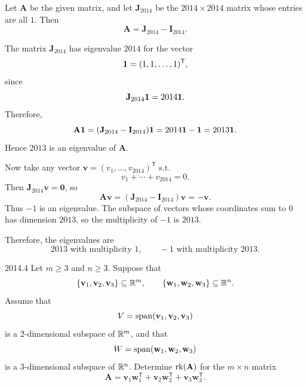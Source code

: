     \begin{solution}
        Let $\mathbf{A}$ be the given matrix, and let $\mathbf{J}_{2014}$ be the $2014\times 2014$ matrix
        whose entries are all $1$. Then
        \[
            \mathbf{A}=\mathbf{J}_{2014}-\mathbf{I}_{2014}.
        \]

        The matrix $\mathbf{J}_{2014}$ has eigenvalue $2014$ for the vector
        \[
            \mathbf{1}=(1,1,\dots,1)^{\mathsf T},
        \]
        since
        \[
            \mathbf{J}_{2014}\mathbf{1}=2014\mathbf{1}.
        \]
        Therefore,
        \[
            \mathbf{A}\mathbf{1}
            =
            (\mathbf{J}_{2014}-\mathbf{I}_{2014})\mathbf{1}
            =
            2014\mathbf{1}-\mathbf{1}
            =
            2013\mathbf{1}.
        \]
        Hence $2013$ is an eigenvalue of $\mathbf{A}$.

        Now take any vector $\mathbf{v}=(v_1,\dots,v_{2014})^{\mathsf T}$ s.t.
        \[
            v_1+\cdots+v_{2014}=0.
        \]
        Then $\mathbf{J}_{2014}\mathbf{v}=\mathbf{0}$, so
        \[
            \mathbf{A}\mathbf{v}
            =
            (\mathbf{J}_{2014}-\mathbf{I}_{2014})\mathbf{v}
            =
            -\mathbf{v}.
        \]
        Thus $-1$ is an eigenvalue. The subspace of vectors whose coordinates sum to $0$ has
        dimension $2013$, so the multiplicity of $-1$ is $2013$.

        Therefore, the eigenvalues are
        \[
            \boxed{2013 \text{ with multiplicity } 1,\qquad -1 \text{ with multiplicity } 2013}.
        \]
    \end{solution}

    \begin{pastproblem}{2014.4}
        Let $m\geq 3$ and $n\geq 3$. Suppose that
        \[
            \{\mathbf{v}_1,\mathbf{v}_2,\mathbf{v}_3\}\subseteq \mathbb{R}^m,
            \qquad
            \{\mathbf{w}_1,\mathbf{w}_2,\mathbf{w}_3\}\subseteq \mathbb{R}^n.
        \]
        Assume that
        \[
            V=\operatorname{span}(\mathbf{v}_1,\mathbf{v}_2,\mathbf{v}_3)
        \]
        is a $2$-dimensional subspace of $\mathbb{R}^m$, and that
        \[
            W=\operatorname{span}(\mathbf{w}_1,\mathbf{w}_2,\mathbf{w}_3)
        \]
        is a $3$-dimensional subspace of $\mathbb{R}^n$. Determine $\operatorname{rk}(\mathbf{A})$ for the $m\times n$
        matrix
        \[
            \mathbf{A}
            =
            \mathbf{v}_1\mathbf{w}_1^{\mathsf T}
            +
            \mathbf{v}_2\mathbf{w}_2^{\mathsf T}
            +
            \mathbf{v}_3\mathbf{w}_3^{\mathsf T}.
        \]
    \end{pastproblem}

